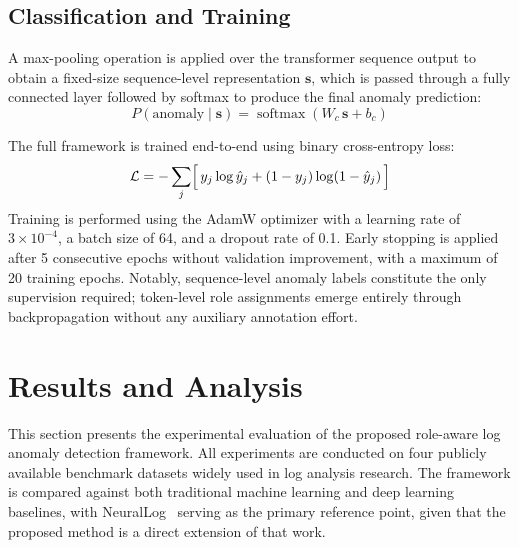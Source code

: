 \subsection{Classification and Training}

A max-pooling operation is applied over the transformer sequence output to obtain a fixed-size sequence-level representation $\mathbf{s}$, which is passed through a fully connected layer followed by softmax to produce the final anomaly prediction:
\begin{equation}
P(\text{anomaly} \mid \mathbf{s}) = \operatorname{softmax}(W_c\, \mathbf{s} + b_c)
\end{equation}

The full framework is trained end-to-end using binary cross-entropy loss:
\begin{equation}
\mathcal{L} = -\sum_{j} \Bigl[\, y_j \log \hat{y}_j + (1 - y_j)\log(1 - \hat{y}_j) \,\Bigr]
\end{equation}
Training is performed using the AdamW optimizer with a learning rate of $3 \times 10^{-4}$, a batch size of 64, and a dropout rate of 0.1. Early stopping is applied after 5 consecutive epochs without validation improvement, with a maximum of 20 training epochs. Notably, sequence-level anomaly labels constitute the only supervision required; token-level role assignments emerge entirely through backpropagation without any auxiliary annotation effort.
\section{Results and Analysis}
\label{sec:lad-results}

This section presents the experimental evaluation of the proposed role-aware log anomaly detection framework. All experiments are conducted on four publicly available benchmark datasets widely used in log analysis research. The framework is compared against both traditional machine learning and deep learning baselines, with NeuralLog~\cite{neurallog2021} serving as the primary reference point, given that the proposed method is a direct extension of that work.

